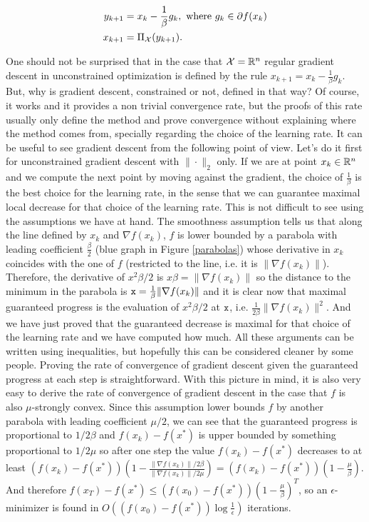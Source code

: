 \begin{align*}
    y_{k+1} &= x_k -\frac{1}{\beta} g_k, \text{ where } g_k \in \partial f(x_k) \\
    x_{k+1} &= \Pi_{\mathcal{X}}(y_{k+1}). \\
\end{align*}

One should not be surprised that in the case that $\mathcal{X} = \mathbb{R}^n$ regular gradient descent in unconstrained optimization is defined by the rule $ x_{k+1} = x_k -\frac{1}{\beta} g_k$. But, why is gradient descent, constrained or not, defined in that way? Of course, it works and it provides a non trivial convergence rate, but the proofs of this rate usually only define the method and prove convergence without explaining where the method comes from, specially regarding the choice of the learning rate. It can be useful to see gradient descent from the following point of view. Let's do it first for unconstrained gradient descent with $\|{\cdot}\|_2$ only. If we are at point $x_k \in \mathbb{R}^n$ and we compute the next point by moving against the gradient, the choice of $\frac{1}{\beta}$ is the best choice for the learning rate, in the sense that we can guarantee maximal local decrease for that choice of the learning rate. This is not difficult to see using the assumptions we have at hand. The smoothness assumption tells us that along the line defined by $x_k$ and $\nabla f(x_k)$, $f$ is lower bounded by a parabola with leading coefficient $\frac{\beta}{2}$ (blue graph in Figure \ref{parabolas}) whose derivative in $x_k$ coincides with the one of $f$ (restricted to the line, i.e. it is $\lVert \nabla f(x_k) \rVert$). Therefore, the derivative of $x^2\beta/2 $ is $x\beta = \lVert \nabla f(x_k) \rVert$ so the distance to the minimum in the parabola is ${\tt x} = \frac{1}{\beta}\lVert \nabla f(x_k) \rVert$ and it is clear now that maximal guaranteed progress is the evaluation of $x^2\beta/2 $ at $\tt{x}$, i.e. $\frac{1}{2\beta} \lVert \nabla f(x_k) \rVert^2$. And we have just proved that the guaranteed decrease is maximal for that choice of the learning rate and we have computed how much. All these arguments can be written using inequalities, but hopefully this can be considered cleaner by some people. %
Proving the rate of convergence of gradient descent given the guaranteed progress at each step is straightforward. With this picture in mind, it is also very easy to derive the rate of convergence of gradient descent in the case that $f$ is also $\mu$-strongly convex. Since this assumption lower bounds $f$ by another parabola with leading coefficient $\mu/2$, we can see that the guaranteed progress is proportional to $1/2\beta$ and $f(x_k) - f(x^\ast)$ is upper bounded by something proportional to $1/2\mu$ so after one step the value $f(x_k)-f(x^\ast)$ decreases to at least $(f(x_k)-f(x^\ast))\left(1 - \frac{\lVert \nabla f(x_k) \rVert/2\beta}{\lVert \nabla f(x_k) \rVert/2\mu}\right) = (f(x_k)-f(x^\ast))\left(1- \frac{\mu}{\beta}\right)$. And therefore $f(x_T)-f(x^\ast) \leq (f(x_0) - f(x^\ast))\left(1- \frac{\mu}{\beta}\right)^T$, so an $\epsilon$-minimizer is found in $O\left((f(x_0) - f(x^\ast))\log \frac{1}{\epsilon}\right)$ iterations.


